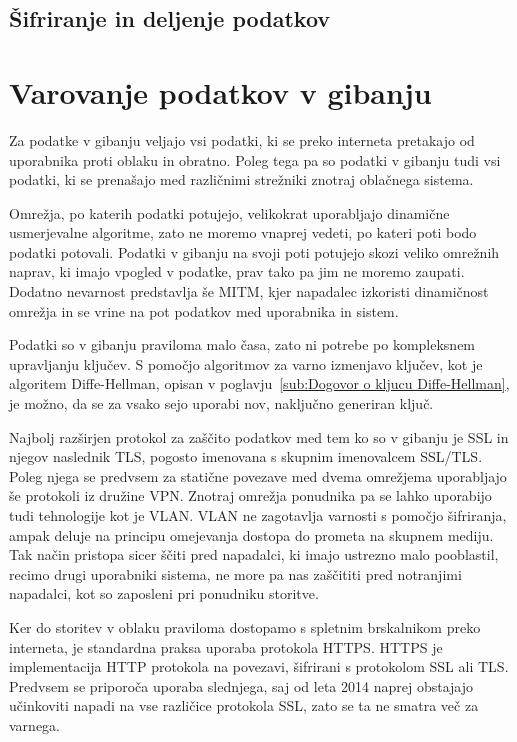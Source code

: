 \documentclass[12pt,a4paper,openany,tikz]{book}
\theoremstyle{plain}
\theoremstyle{definition}
\begin{document}
\subsection{Šifriranje in deljenje podatkov}
\label{sub:Šifriranje in deljenje podatkov}


\section{Varovanje podatkov v gibanju}
\label{sec:Varovanje podatkov v gibanju}

Za podatke v gibanju veljajo vsi podatki, ki se preko interneta pretakajo od uporabnika proti oblaku in obratno. Poleg tega pa so podatki v gibanju tudi vsi podatki, ki se prenašajo med različnimi strežniki znotraj oblačnega sistema.

Omrežja, po katerih podatki potujejo, velikokrat uporabljajo dinamične usmerjevalne algoritme, zato ne moremo vnaprej vedeti, po kateri poti bodo podatki potovali. Podatki v gibanju na svoji poti potujejo skozi veliko omrežnih naprav, ki imajo vpogled v podatke, prav tako pa jim ne moremo zaupati. Dodatno nevarnost predstavlja še \gls{MITM}, kjer napadalec izkoristi dinamičnost omrežja in se vrine na pot podatkov med uporabnika in sistem.

Podatki so v gibanju praviloma malo časa, zato ni potrebe po kompleksnem upravljanju ključev. S pomočjo algoritmov za varno izmenjavo ključev, kot je algoritem  Diffe-Hellman, opisan v poglavju~\ref{sub:Dogovor o kljucu Diffe-Hellman}, je možno, da se za vsako sejo uporabi nov, naključno generiran ključ.

Najbolj razširjen protokol za zaščito podatkov med tem ko so v gibanju je \gls{SSL} in njegov naslednik \gls{TLS}, pogosto imenovana s skupnim imenovalcem SSL/TLS. Poleg njega se predvsem za statične povezave med dvema omrežjema uporabljajo še protokoli iz družine VPN. Znotraj omrežja ponudnika pa se lahko uporabijo tudi tehnologije kot je VLAN. VLAN ne zagotavlja varnosti s pomočjo šifriranja, ampak deluje na principu omejevanja dostopa do prometa na skupnem mediju. Tak način pristopa sicer ščiti pred napadalci, ki imajo ustrezno malo pooblastil, recimo drugi uporabniki sistema, ne more pa nas zaščititi pred notranjimi napadalci, kot so zaposleni pri ponudniku storitve.

Ker do storitev v oblaku praviloma dostopamo s spletnim brskalnikom preko interneta, je standardna praksa uporaba protokola \gls{HTTPS}. \Gls{HTTPS} je implementacija HTTP protokola na povezavi, šifrirani s protokolom \gls{SSL} ali \gls{TLS}. Predvsem se priporoča uporaba slednjega, saj od leta 2014 naprej obstajajo učinkoviti napadi na vse različice protokola \gls{SSL}, zato se ta ne smatra več za varnega.
\end{document}
